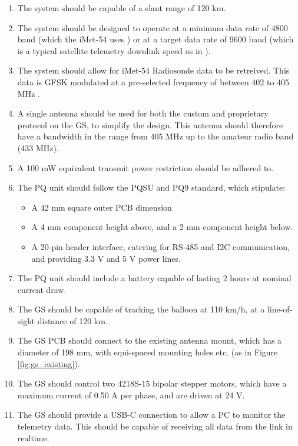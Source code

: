\begin{enumerate}
    \item The system should be capable of a slant range of 120 km.
    \item The system should be designed to operate at a minimum data rate of 4800 baud (which the iMet-54 uses \cite{datasheet-iMet54}) or at a target data rate of 9600 baud (which is a typical satellite telemetry downlink speed as in \cite{paper-deployableAntenna}).
    \item The system should allow for iMet-54 Radiosonde data to be retreived. This data is GFSK modulated at a pre-selected frequency of between 402 to 405 MHz \cite{datasheet-iMet54}.
    \item A single antenna should be used for both the custom and proprietary protocol on the GS, to simplify the design. This antenna should therefore have a bandwidth in the range from 405 MHz up to the amateur radio band (433 MHz).
    \item A 100 mW equivalent transmit power restriction should be adhered to.
    \item The PQ unit should follow the PQSU and PQ9 standard, which stipulate:
    \begin{itemize}
        \item A 42 mm square outer PCB dimension
        \item A 4 mm component height above, and a 2 mm component height below.
        \item A 20-pin header interface, catering for RS-485 and I2C communication, and providing 3.3 V and 5 V power lines.
    \end{itemize}
    \item The PQ unit should include a battery capable of lasting 2 hours at nominal current draw.
    \item The GS should be capable of tracking the balloon at 110 km/h, at a line-of-sight distance of 120 km.
    \item The GS PCB should connect to the existing antenna mount, which has a diameter of 198 mm, with equi-spaced mounting holes etc. (as in Figure \ref{fig:gs_existing}).
    \item The GS should control two 4218S-15 bipolar stepper motors, which have a maximum current of 0.50 A per phase, and are driven at 24 V.
    \item The GS should provide a USB-C connection to allow a PC to monitor the telemetry data. This should be capable of receiving all data from the link in realtime.
\end{enumerate}